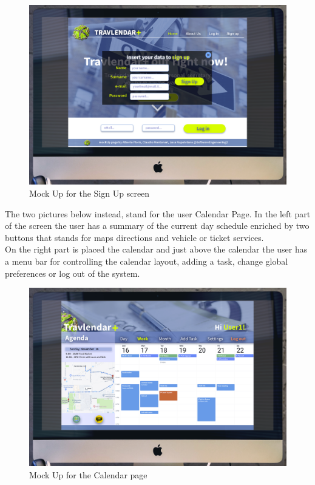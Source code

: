 \begin{figure}[H]
    \centering
    \includegraphics[scale=0.2]{Pictures/UXDiagram/desktopMockUpSignIn.png}
    \caption{Mock Up for the Sign Up screen}
\end{figure}

The two pictures below instead, stand for the user Calendar Page. In the left part of the screen the user has a summary of the current day schedule enriched by two buttons that stands for maps directions and vehicle or ticket services. \\On the right part is placed the calendar and just above the calendar the user has a menu bar for controlling the calendar layout, adding a task, change global preferences or log out of the system. 

\begin{figure}[H]
    \centering
    \includegraphics[scale=0.2]{Pictures/UXDiagram/desktopMockUpCalendar.png}
    \caption{Mock Up for the Calendar page}
    \label{fig:calendarMockUp}
\end{figure}


